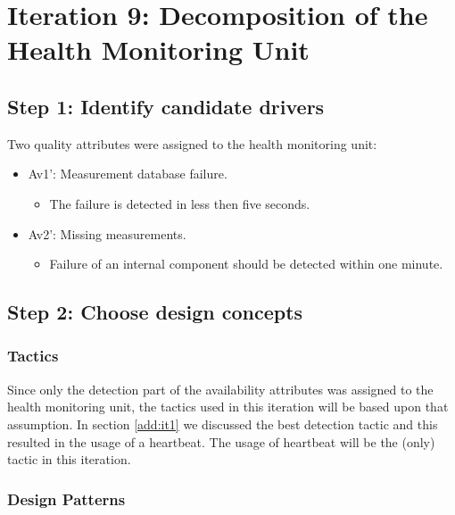 \section{Iteration 9: Decomposition of the Health Monitoring Unit}
\label{add:it9}

\subsection{Step 1: Identify candidate drivers}
\label{add:it9/drivers}

\npar Two quality attributes were assigned to the health monitoring unit:

\begin{itemize}
  	\item Av1': Measurement database failure.
  	\begin{itemize}
  	  \item The failure is detected in less then five seconds.
  	\end{itemize}
  	\item Av2': Missing measurements.
  	\begin{itemize}
  	  \item Failure of an internal component should be detected within one
  	  minute.
  	\end{itemize}
\end{itemize}

\subsection{Step 2: Choose design concepts}
\label{add:it9/concepts}

\subsubsection{Tactics}
\label{add:it9/tactics}

\npar Since only the detection part of the availability attributes was assigned
to the health monitoring unit, the tactics used in this iteration will be based
upon that assumption. In section \ref{add:it1} we discussed the best detection
tactic and this resulted in the usage of a heartbeat. The usage of heartbeat
will be the (only) tactic in this iteration.

\subsubsection{Design Patterns}
\label{add:it9/patterns}

